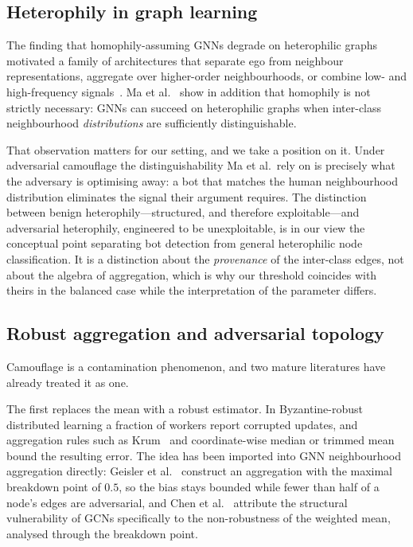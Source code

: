 \documentclass[../elsevier.tex]{subfiles}
\begin{document}
\subsection{Heterophily in graph learning}

The finding that homophily-assuming GNNs degrade on heterophilic graphs motivated a
family of architectures that separate ego from neighbour representations, aggregate
over higher-order neighbourhoods, or combine low- and high-frequency
signals~\citep{zhu2020beyond,luan2022revisiting}. Ma et al.~\citeyearpar{ma2022homophily}
show in addition that homophily is not strictly necessary: GNNs can succeed on
heterophilic graphs when inter-class neighbourhood \emph{distributions} are
sufficiently distinguishable.

That observation matters for our setting, and we take a position on it. Under
adversarial camouflage the distinguishability Ma et al.\ rely on is precisely what
the adversary is optimising away: a bot that matches the human neighbourhood
distribution eliminates the signal their argument requires. The distinction between
benign heterophily---structured, and therefore exploitable---and adversarial
heterophily, engineered to be unexploitable, is in our view the conceptual point
separating bot detection from general heterophilic node classification. It is a
distinction about the \emph{provenance} of the inter-class edges, not about the
algebra of aggregation, which is why our threshold coincides with theirs in the
balanced case while the interpretation of the parameter differs.

\subsection{Robust aggregation and adversarial topology}
\label{sec:related-robust}

Camouflage is a contamination phenomenon, and two mature literatures have already
treated it as one.

The first replaces the mean with a robust estimator. In Byzantine-robust distributed
learning a fraction of workers report corrupted updates, and aggregation rules such
as Krum~\citep{blanchard2017machine} and coordinate-wise median or trimmed
mean~\citep{yin2018byzantine} bound the resulting error. The idea has been imported
into GNN neighbourhood aggregation directly: Geisler
et al.~\citeyearpar{geisler2020reliable} construct an aggregation with the maximal
breakdown point of $0.5$, so the bias stays bounded while fewer than half of a
node's edges are adversarial, and Chen et al.~\citeyearpar{chen2021understanding} attribute
the structural vulnerability of GCNs specifically to the non-robustness of the
weighted mean, analysed through the breakdown point.
\end{document}
